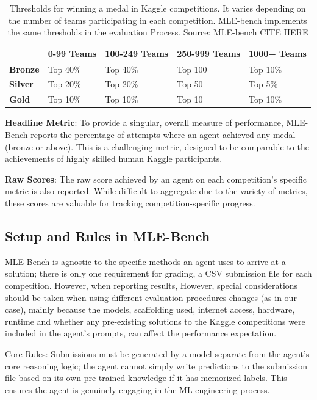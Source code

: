 \begin{table}[htbp] %
\centering
\caption{Thresholds for winning a medal in Kaggle competitions. It varies depending on the number of teams participating in each competition. MLE-bench implements the same thresholds in the evaluation Process. Source: MLE-bench CITE HERE}
\label{tab:medal_thresholds}
\begin{tabular}{@{}l llll@{}} %
\toprule
& \textbf{0-99 Teams} & \textbf{100-249 Teams} & \textbf{250-999 Teams} & \textbf{1000+ Teams} \\
\midrule
\textbf{Bronze} & Top 40\% & Top 40\% & Top 100 & Top 10\% \\
\textbf{Silver} & Top 20\% & Top 20\% & Top 50  & Top 5\%  \\
\textbf{Gold}   & Top 10\% & Top 10\% & Top 10  & Top 10\%  \\
\bottomrule
\end{tabular}
\end{table}

\textbf{Headline Metric}: To provide a singular, overall measure of performance, MLE-Bench reports the percentage of attempts where an agent achieved any medal (bronze or above). This is a challenging metric, designed to be comparable to the achievements of highly skilled human Kaggle participants.

\textbf{Raw Scores}: The raw score achieved by an agent on each competition's specific metric is also reported. While difficult to aggregate due to the variety of metrics, these scores are valuable for tracking competition-specific progress.

\subsection{Setup and Rules in MLE-Bench}

MLE-Bench is agnostic to the specific methods an agent uses to arrive at a solution; there is only one requirement for grading, a CSV submission file for each competition. However, when reporting results, However, special considerations should be taken when using different evaluation procedures changes (as in our case), mainly because the models, scaffolding used, internet access, hardware, runtime and whether any pre-existing solutions to the Kaggle competitions were included in the agent's prompts, can affect the performance expectation.

Core Rules:
Submissions must be generated by a model separate from the agent's core reasoning logic; the agent cannot simply write predictions to the submission file based on its own pre-trained knowledge if it has memorized labels. This ensures the agent is genuinely engaging in the ML engineering process.

